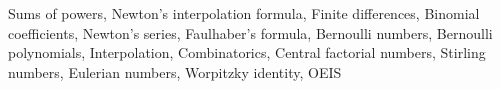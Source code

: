 Sums of powers, Newton's interpolation formula, Finite differences, Binomial coefficients, Newton's series, Faulhaber's formula, Bernoulli numbers, Bernoulli polynomials, Interpolation, Combinatorics, Central factorial numbers, Stirling numbers, Eulerian numbers, Worpitzky identity, OEIS
